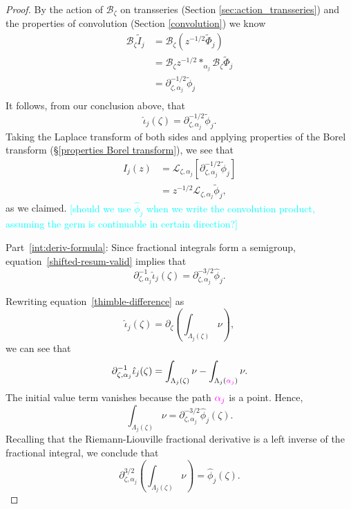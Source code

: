 \documentclass{article}
\theoremstyle{definition}
\newcommand{\C}{\mathbb{C}}
\newcommand{\fracderiv}[3]{\partial^{#1}_{#2, #3}}
\newcommand{\laplace}{\mathcal{L}}
\newcommand{\borel}{\mathcal{B}}
\theoremstyle{plain}
\begin{document}
\begin{proof}
By the action of $\borel_\zeta$ on transseries (Section \ref{sec:action_transseries}) and the properties of convolution (Section \ref{convolution}) we know 
\begin{align*}
\borel_{\zeta} \tilde{I}_j & = \borel_{\zeta}( z^{-1/2} \tilde{\Phi}_j) \\
&=\borel_\zeta z^{-1/2}\ast_{\alpha_j}\borel_\zeta\tilde{\Phi}_j\\
& = \fracderiv{-1/2}{\zeta}{\alpha_j}  \tilde{\phi}_j \\
\end{align*}
It follows, from our conclusion above, that
\begin{equation}\label{shifted-resum-valid}
\hat{\iota}_j(\zeta) = \fracderiv{-1/2}{\zeta}{\alpha_j} \tilde{\phi}_j.
\end{equation}
Taking the Laplace transform of both sides and applying properties of the Borel transform (\S \ref{properties Borel transform}), we see that
\begin{align*}
I_j(z) & = \laplace_{\zeta, \alpha_j} \left[ \partial^{-1/2}_{\zeta, \alpha_j}  \tilde{\phi}_j \right] \\
& = z^{-1/2} \laplace_{\zeta, \alpha_j} \tilde{\phi}_j,
\end{align*}
as we claimed. \textcolor{cyan}{[should we use $\hat{\phi}_j$ when we write the convolution product, assuming the germ is continuable in certain direction?]}

Part~\eqref{int:deriv-formula}: Since fractional integrals form a semigroup, equation~\eqref{shifted-resum-valid} implies that
\[ \fracderiv{-1}{\zeta}{\alpha_j} \hat{\iota}_j(\zeta) = \fracderiv{-3/2}{\zeta}{\alpha_j} \hat{\phi}_j. \]

Rewriting equation~\eqref{thimble-difference} as
\[ \hat{\iota}_j(\zeta) = \partial_\zeta \left( \int_{\Lambda_j(\zeta)} \nu \right), \]
we can see that
\[ \fracderiv{-1}{\zeta}{\alpha_j} \hat{\iota}_j(\zeta) = \int_{\Lambda_j(\zeta)} \nu - \int_{\Lambda_j(\textcolor{Magenta}{\alpha_j})} \nu. \]
The initial value term vanishes because the path $\textcolor{Magenta}{\alpha_j}$ is a point. Hence,
\[ \int_{\Lambda_j(\zeta)} \nu = \fracderiv{-3/2}{\zeta}{\alpha_j} \hat{\phi}_j(\zeta). \]
Recalling that the Riemann-Liouville fractional derivative is a left inverse of the fractional integral, we conclude that
\[ \fracderiv{3/2}{\zeta}{\alpha_j} \left( \int_{\Lambda_j(\zeta)} \nu \right) = \hat{\phi}_j(\zeta). \]
\end{proof}
\end{document}
